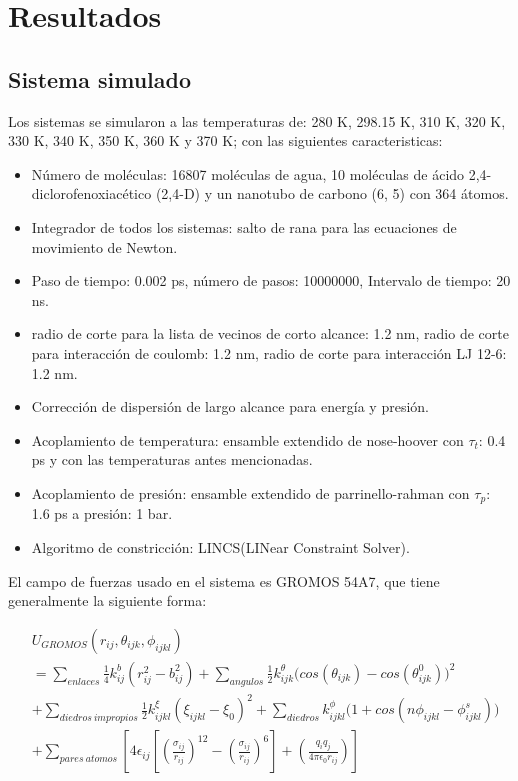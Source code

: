 \chapter{Resultados}

\section{Sistema simulado}

Los sistemas se simularon a las temperaturas de: 280 K, 298.15 K, 310 K, 320 K, 330 K, 340 K, 350 K, 360 K y 370 K; con las siguientes caracteristicas:

\begin{itemize}
    \item Número de moléculas: 16807 moléculas de agua, 10 moléculas de ácido 2,4-diclorofenoxiacético (2,4-D) y un nanotubo de carbono (6, 5) con 364 átomos.
    \item Integrador de todos los sistemas: salto de rana para las ecuaciones de movimiento de Newton.
    \item Paso de tiempo: 0.002 ps, número de pasos: 10000000, Intervalo de tiempo: 20 ns.
    \item radio de corte para la lista de vecinos de corto alcance: 1.2 nm, radio de corte para interacción de coulomb: 1.2 nm, radio de corte para interacción LJ 12-6: 1.2 nm.
    \item Corrección de dispersión de largo alcance para energía y presión.
    \item Acoplamiento de temperatura: ensamble extendido de nose-hoover con $\tau_t$: 0.4 ps y con las temperaturas antes mencionadas.
    \item Acoplamiento de presión: ensamble extendido de parrinello-rahman con $\tau_p$: 1.6 ps a presión: 1 bar.
    \item Algoritmo de constricción: LINCS(LINear Constraint Solver).
\end{itemize}

El campo de fuerzas usado en el sistema es GROMOS 54A7, que tiene generalmente la siguiente forma:

\begin{equation}
\begin{split}
    &{U}_{GROMOS}(r_{ij},\theta_{ijk},\phi_{ijkl})\\ & = \sum_{enlaces}\frac{1}{4}k_{ij}^{b}(r_{ij}^2 - b^{2}_{ij}) + \sum_{angulos} \frac{1}{2}k^{\theta}_{ijk}\Big(cos(\theta_{ijk}) - cos(\theta^{0}_{ijk})\Big)^2\\ 
    &+ \sum_{diedros\ impropios}\frac{1}{2}k^{\xi}_{ijkl}(\xi_{ijkl} - \xi_{0})^2 + \sum_{diedros}k^{\phi}_{ijkl}\Big(1 + cos(n\phi_{ijkl} - \phi^{s}_{ijkl}) \Big)\\ 
    &+ \sum_{pares\ atomos}\left[4\epsilon_{ij} \left[\left(\frac{\sigma_{ij}}{r_{ij}} \right)^{12} - \left(\frac{\sigma_{ij}}{r_{ij}}\right)^6 \right] + \left(\frac{q_i q_j}{4\pi \epsilon_{0} r_{ij}}\right)\right]
    \end{split}
\end{equation}

